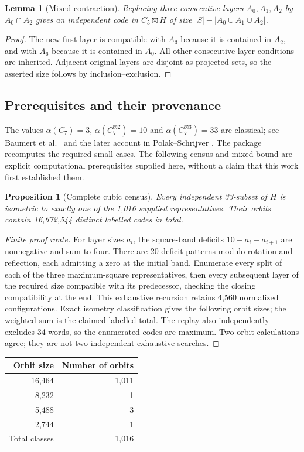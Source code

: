 \documentclass[11pt]{article}
\newtheorem{lemma}[theorem]{Lemma}
\newtheorem{proposition}[theorem]{Proposition}
\theoremstyle{definition}
\newcommand{\G}[1]{C_7^{\boxtimes #1}}
\begin{document}
\begin{lemma}[Mixed contraction]\label{lem:contract}
Replacing three consecutive layers $A_0,A_1,A_2$ by $A_0\cap A_2$
gives an independent code in $C_5\boxtimes H$ of size
$|S|-|A_0\cup A_1\cup A_2|$.
\end{lemma}
\begin{proof}
The new first layer is compatible with $A_3$ because it is contained in
$A_2$, and with $A_6$ because it is contained in $A_0$. All other
consecutive-layer conditions are inherited. Adjacent original layers are
disjoint as projected sets, so the asserted size follows by
inclusion--exclusion.
\end{proof}

\subsection{Prerequisites and their provenance}
The values $\alpha(C_7)=3$, $\alpha(\G2)=10$ and
$\alpha(\G3)=33$ are classical; see Baumert et al.\ \cite{baumert}
and the later account in Polak--Schrijver \cite{polak}. The package
recomputes the required small cases. The following census and mixed bound
are explicit computational prerequisites supplied here, without a claim
that this work first established them.

\begin{proposition}[Complete cubic census]\label{prop:census}
Every independent 33-subset of $H$ is isometric to exactly one of the
1,016 supplied representatives. Their orbits contain 16,672,544 distinct
labelled codes in total.
\end{proposition}
\begin{proof}[Finite proof route]
For layer sizes $a_i$, the square-band deficits $10-a_i-a_{i+1}$
are nonnegative and sum to four. There are 20 deficit patterns modulo
rotation and reflection, each admitting a zero at the initial band.
Enumerate every split of each of the three maximum-square representatives,
then every subsequent layer of the required size compatible with its
predecessor, checking the closing compatibility at the end. This exhaustive
recursion retains 4,560 normalized configurations. Exact isometry
classification gives the following orbit sizes; the weighted sum is the
claimed labelled total. The replay also independently excludes 34 words,
so the enumerated codes are maximum. Two orbit calculations agree; they
are not two independent exhaustive searches.
\end{proof}
\begin{center}
\begin{tabular}{rr}\toprule Orbit size & Number of orbits\\\midrule
16,464 & 1,011\\8,232 & 1\\5,488 & 3\\2,744 & 1\\\midrule
\multicolumn{1}{l}{Total classes} & 1,016\\\bottomrule
\end{tabular}
\end{center}
\end{document}
